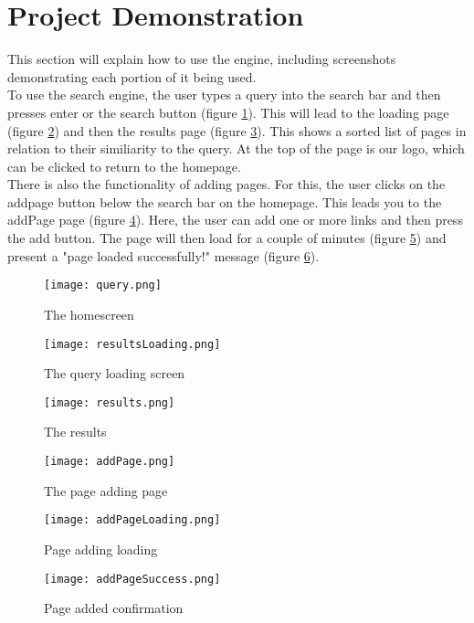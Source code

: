 \section{Project Demonstration}
This section will explain how to use the engine, including screenshots demonstrating each portion of it being used. \\
To use the search engine, the user types a query into the search bar and then presses enter or the search button (figure \ref{fig:homescreen}). This will lead to the loading page (figure \ref{fig:loading}) and then the results page (figure \ref{fig:results}). This shows a sorted list of pages in relation to their similiarity to the query. At the top of the page is our logo, which can be clicked to return to the homepage.\\
There is also the functionality of adding pages. For this, the user clicks on the addpage button below the search bar on the homepage. This leads you to the addPage page (figure \ref{fig:add}). Here, the user can add one or more links and then press the add button. The page will then load for a couple of minutes (figure \ref{fig:adding}) and present a "page loaded successfully!" message (figure \ref{fig:added}).

\begin{figure}
    \texttt{[image: query.png]}\\
    \caption{The homescreen}
    \label{fig:homescreen}
\end{figure}

\begin{figure}
    \texttt{[image: resultsLoading.png]}\\
    \caption{The query loading screen}
    \label{fig:loading}
\end{figure}

\begin{figure}
    \texttt{[image: results.png]}\\
    \caption{The results}
    \label{fig:results}
\end{figure}

\begin{figure}
    \texttt{[image: addPage.png]}\\
    \caption{The page adding page}
    \label{fig:add}
\end{figure}

\begin{figure}
    \texttt{[image: addPageLoading.png]}\\
    \caption{Page adding loading}
    \label{fig:adding}
\end{figure}

\begin{figure}
    \texttt{[image: addPageSuccess.png]}\\
    \caption{Page added confirmation}
    \label{fig:added}
\end{figure}
